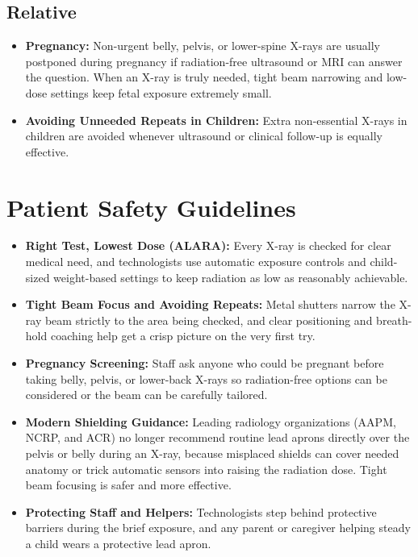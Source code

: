 \subsection{Relative}

\begin{itemize}
    \item \textbf{Pregnancy:} Non-urgent belly, pelvis, or lower-spine X-rays are usually postponed during pregnancy if radiation-free ultrasound or MRI can answer the question. When an X-ray is truly needed, tight beam narrowing and low-dose settings keep fetal exposure extremely small.
    \item \textbf{Avoiding Unneeded Repeats in Children:} Extra non-essential X-rays in children are avoided whenever ultrasound or clinical follow-up is equally effective.
\end{itemize}

\section{Patient Safety Guidelines}

\begin{itemize}
    \item \textbf{Right Test, Lowest Dose (ALARA):} Every X-ray is checked for clear medical need, and technologists use automatic exposure controls and child-sized weight-based settings to keep radiation as low as reasonably achievable.
    \item \textbf{Tight Beam Focus and Avoiding Repeats:} Metal shutters narrow the X-ray beam strictly to the area being checked, and clear positioning and breath-hold coaching help get a crisp picture on the very first try.
    \item \textbf{Pregnancy Screening:} Staff ask anyone who could be pregnant before taking belly, pelvis, or lower-back X-rays so radiation-free options can be considered or the beam can be carefully tailored.
    \item \textbf{Modern Shielding Guidance:} Leading radiology organizations (AAPM, NCRP, and ACR) no longer recommend routine lead aprons directly over the pelvis or belly during an X-ray, because misplaced shields can cover needed anatomy or trick automatic sensors into raising the radiation dose. Tight beam focusing is safer and more effective.
    \item \textbf{Protecting Staff and Helpers:} Technologists step behind protective barriers during the brief exposure, and any parent or caregiver helping steady a child wears a protective lead apron.
\end{itemize}

